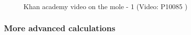      

\label{m38717*eip-945}
    \setcounter{subfigure}{0}


	\begin{figure}[H] %
    
    
    \textnormal{Khan academy video on the mole - 1}\vspace{.1in} \nopagebreak
  \label{m38717*yt-media2}\label{m38717*yt-video2}
             { (Video:  P10085 )}
      
      \vspace{2pt}
    \vspace{.1in}
    
    

 \end{figure}   

    \addtocounter{footnote}{-0}
    \par \label{m38717*secfhsst!!!underscore!!!id850}
            \subsubsection{  More advanced calculations
      }
            \nopagebreak
            
